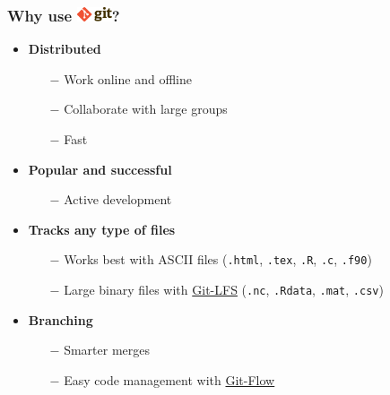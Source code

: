 \documentclass[svgnames]{beamer}
\begin{document}
\begin{frame}[fragile]
    \frametitle{Why use \includegraphics[height=12pt]{img/git_logo.png}?}
    \begin{itemize}
        \item { \textbf{Distributed}
            \begin{itemize}
                \item[$-$]{Work online and offline}
                \item[$-$]{Collaborate with large groups}
                \item[$-$]{Fast}
            \end{itemize}
		}         
        \item{ \textbf{Popular and successful}
            \begin{itemize}
                \item[$-$]{Active development}
            \end{itemize}
            }
 
        \item{ \textbf{Tracks any type of files}
            \begin{itemize}
                \item[$-$]{Works best with ASCII files (\verb+.html+, \verb+.tex+, \verb+.R+, \verb+.c+, \verb+.f90+)}
                \item[$-$]{Large binary files with \href{https://git-lfs.github.com/}{Git-LFS} (\verb+.nc+, \verb+.Rdata+, \verb+.mat+, \verb+.csv+)}
            \end{itemize}
            }

        \item { \textbf{Branching}
            \begin{itemize}
                \item[$-$]{Smarter merges}
                \item[$-$]{Easy code management with \href{https://git-flow.readthedocs.io/fr/latest/index.html}{Git-Flow}}
            \end{itemize}
        }
        
       
    \end{itemize}
\end{frame}
\end{document}
